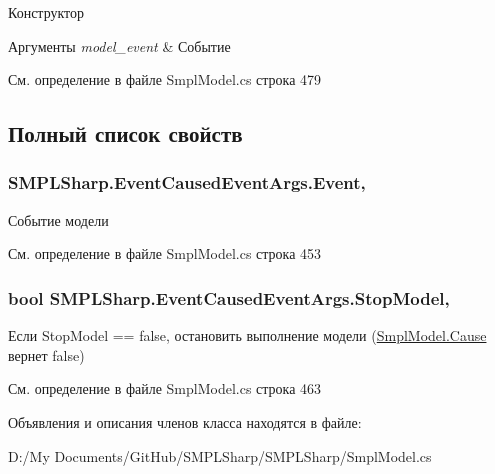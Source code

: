 Конструктор 


\begin{DoxyParams}{Аргументы}
{\em model\-\_\-event} & Событие\\
\hline
\end{DoxyParams}


См. определение в файле Smpl\-Model.\-cs строка 479



\subsection{Полный список свойств}
\hypertarget{class_s_m_p_l_sharp_1_1_event_caused_event_args_a80b38440396634a116a83be4a84c5c79}{
\subsubsection[{Event}]{ S\-M\-P\-L\-Sharp.\-Event\-Caused\-Event\-Args.\-Event\hspace{0.3cm}{\ttfamily [get]}, {\ttfamily [set]}}}\label{d0/dff/class_s_m_p_l_sharp_1_1_event_caused_event_args_a80b38440396634a116a83be4a84c5c79}


Событие модели 



См. определение в файле Smpl\-Model.\-cs строка 453

\hypertarget{class_s_m_p_l_sharp_1_1_event_caused_event_args_a76f44df5427c47df70a0f4eb5d1d551b}{
\subsubsection[{Stop\-Model}]{\setlength{\rightskip}{0pt plus 5cm}bool S\-M\-P\-L\-Sharp.\-Event\-Caused\-Event\-Args.\-Stop\-Model\hspace{0.3cm}{\ttfamily [get]}, {\ttfamily [set]}}}\label{d0/dff/class_s_m_p_l_sharp_1_1_event_caused_event_args_a76f44df5427c47df70a0f4eb5d1d551b}


Если Stop\-Model == false, остановить выполнение модели (\hyperlink{class_s_m_p_l_sharp_1_1_smpl_model_a1101457a63f40e7d80e707d7793f35ee}{Smpl\-Model.\-Cause} вернет false) 



См. определение в файле Smpl\-Model.\-cs строка 463



Объявления и описания членов класса находятся в файле\-:\begin{DoxyCompactItemize}
\item 
D\-:/\-My Documents/\-Git\-Hub/\-S\-M\-P\-L\-Sharp/\-S\-M\-P\-L\-Sharp/Smpl\-Model.\-cs\end{DoxyCompactItemize}
